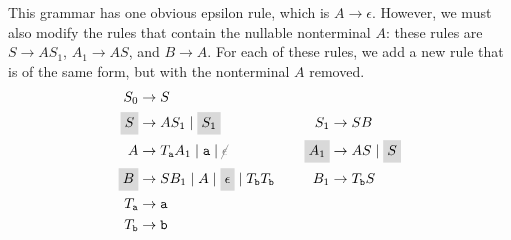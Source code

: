 \begin{example}
\begin{enumerate}
This grammar has one obvious epsilon rule, which is $A \rightarrow \epsilon$. However, we must also modify the rules that contain the nullable nonterminal $A$: these rules are $S \rightarrow AS_{1}$, $A_{1} \rightarrow AS$, and $B \rightarrow A$. For each of these rules, we add a new rule that is of the same form, but with the nonterminal $A$ removed.
\begin{equation*}
\begin{aligned}[t]
S_{0}					&\rightarrow S \\
\highlightmath{S}			&\rightarrow AS_{1} \mid \highlightmath{S_{1}} \\
A						&\rightarrow T_{\texttt{a}}A_{1} \mid \texttt{a} \mid {\color{\neutralcolour}\cancel{\epsilon}} \phantom{\highlightmath{S_{0}}} \\
\highlightmath{B}			&\rightarrow SB_{1} \mid A \mid \highlightmath{\epsilon} \mid T_{\texttt{b}}T_{\texttt{b}} \\
T_{\texttt{a}}				&\rightarrow \texttt{a} \\
T_{\texttt{b}}				&\rightarrow \texttt{b}
\end{aligned}
\hspace{0.75cm}
\begin{aligned}[t]
\phantom{S_{0}} & \\
S_{1}					&\rightarrow SB \phantom{\highlightmath{S_{0}}} \\
\highlightmath{A_{1}}			&\rightarrow AS \mid \highlightmath{S} \\
B_{1}					&\rightarrow T_{\texttt{b}}S \phantom{\highlightmath{S_{0}}}
\end{aligned}
\end{equation*}


\end{enumerate}
\end{example}
